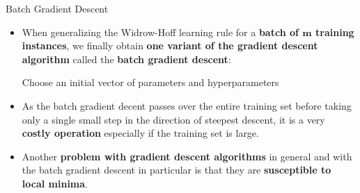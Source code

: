 \documentclass[document.tex]{subfiles}
\begin{document}
    \begin{frame}{Batch Gradient Descent}
        \begin{itemize}
            \item When generalizing the Widrow-Hoff learning rule for a \textbf{batch of $\pmb{m}$ training instances}, we finally obtain \textbf{one variant of the gradient descent algorithm} called the \textbf{batch gradient descent}:
            
            \begin{center}
                \begin{minipage}{.85\linewidth}
                    \begin{algorithm}[H]
                        \DontPrintSemicolon
                        \caption{Batch Gradient Descent}
                        Choose an initial vector of parameters and hyperparameters\;
                    \end{algorithm}
                \end{minipage}
            \end{center}
            
            \vspace*{2mm}
            \item As the batch gradient decent passes over the entire training set before taking only a single small step in the direction of steepest descent, it is a very \textbf{costly operation} especially if the training set is large.
            \item Another \textbf{problem with gradient descent algorithms} in general and with the batch gradient descent in particular is that they are \textbf{susceptible to local minima}.
        \end{itemize}
    \end{frame}	
\end{document}
